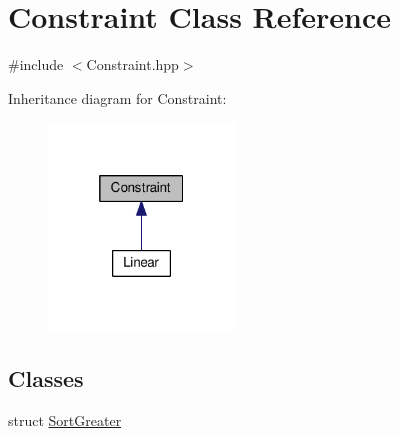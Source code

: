 \hypertarget{class_constraint}{\section{Constraint Class Reference}
\label{class_constraint}
}


{\ttfamily \#include $<$Constraint.\-hpp$>$}



Inheritance diagram for Constraint\-:\nopagebreak
\begin{figure}[H]
\begin{center}
\leavevmode
\includegraphics[width=140pt]{class_constraint__inherit__graph}
\end{center}
\end{figure}
\subsection*{Classes}
\begin{DoxyCompactItemize}
\item 
struct \hyperlink{struct_constraint_1_1_sort_greater}{Sort\-Greater}
\end{DoxyCompactItemize}
